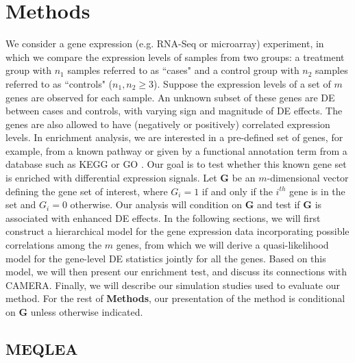 \documentclass[a4,center,fleqn]{NAR}
\newcommand{\OurMethod}{MEQLEA}
\begin{document}
	\section{Methods}\label{section:methods}
	We consider a gene expression (e.g. RNA-Seq or microarray) experiment, in which we compare the 
	expression levels of samples from two groups: a treatment group with $n_1$ samples referred to as
	``cases" and a control group with $n_2$ samples referred to as ``controls" ($n_1,n_2\ge 3$). Suppose
	the expression levels of a set of $m$ genes are observed for each sample. An unknown subset of
	these genes are DE between cases and controls, with varying sign and magnitude of DE effects. The
	genes are also allowed to have (negatively or positively) correlated expression levels. In
	enrichment analysis, we are interested in a pre-defined set of genes, for example, from a known
	pathway or given by a functional annotation term from a database such as KEGG
	\citep{kanehisa2000kegg} or GO \citep{ashburner2000gene}. Our goal is to test whether this known
	gene set is enriched with differential expression signals. Let $\bm G$ be an $m$-dimensional vector
	defining the gene set of interest, where $G_i=1$ if and only if the $i^{th}$ gene is in the set and
	$G_i=0$ otherwise. Our analysis will condition on $\bm G$ and test if $\bm G$ is associated with
	enhanced DE effects. In the following sections, we will first construct a hierarchical model for the
	gene expression data incorporating possible correlations among the $m$ genes, from which we will
	derive a quasi-likelihood model for the gene-level DE statistics jointly for all the genes. Based on
	this model, we will then present our enrichment test, and discuss its connections with CAMERA.
	Finally, we will describe our simulation studies used to evaluate our method. For the rest of
	\textbf{Methods}, our presentation of the method is conditional on $\bm G$ unless otherwise
	indicated.
	
	\subsection{\OurMethod}
\end{document}
